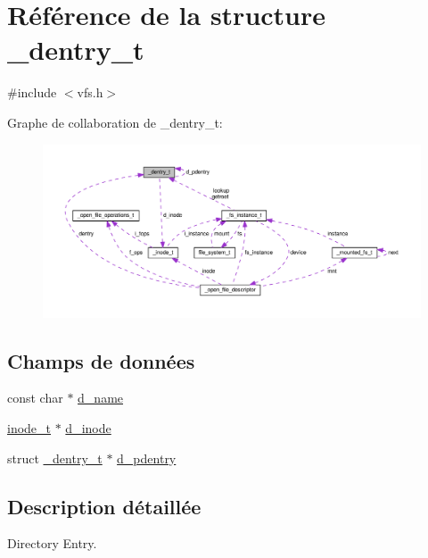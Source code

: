 \hypertarget{struct__dentry__t}{\section{Référence de la structure \+\_\+dentry\+\_\+t}
\label{struct__dentry__t}
}


{\ttfamily \#include $<$vfs.\+h$>$}



Graphe de collaboration de \+\_\+dentry\+\_\+t\+:
\nopagebreak
\begin{figure}[H]
\begin{center}
\leavevmode
\includegraphics[width=350pt]{struct__dentry__t__coll__graph}
\end{center}
\end{figure}
\subsection*{Champs de données}
\begin{DoxyCompactItemize}
\item 
const char $\ast$ \hyperlink{struct__dentry__t_ac9b991f6f5d5c5ce60e8d256d667265e}{d\+\_\+name}
\item 
\hyperlink{vfs_8h_af51b41660b60ad79b490887fe6e22da9}{inode\+\_\+t} $\ast$ \hyperlink{struct__dentry__t_ac711731a0c08b35b5d2731b8545c7454}{d\+\_\+inode}
\item 
struct \hyperlink{struct__dentry__t}{\+\_\+dentry\+\_\+t} $\ast$ \hyperlink{struct__dentry__t_a900178add855a65bb2c42a1fbb94686b}{d\+\_\+pdentry}
\end{DoxyCompactItemize}


\subsection{Description détaillée}
Directory Entry. 

